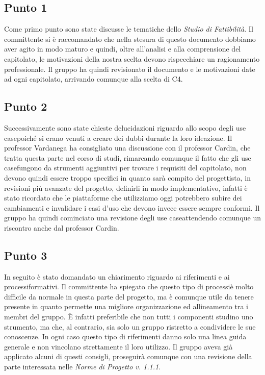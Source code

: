    \subsection{Punto 1}
        Come primo punto sono state discusse le tematiche dello \textit{Studio di Fattibilità}. Il committente si è raccomandato che nella stesura di questo documento dobbiamo aver agito in modo maturo e quindi, oltre all'analisi e alla comprensione del capitolato\glo, le motivazioni della nostra scelta devono rispecchiare un ragionamento professionale. Il gruppo ha quindi revisionato il documento e le motivazioni date ad ogni capitolato\glo, arrivando comunque alla scelta di C4.
    \subsection{Punto 2}
        Successivamente sono state chieste delucidazioni riguardo allo scopo degli use case\glosp poiché si erano venuti a creare dei dubbi durante la loro ideazione. Il professor Vardanega ha consigliato una discussione con il professor Cardin, che tratta questa parte nel corso di studi, rimarcando comunque il fatto che gli use case\glosp fungono da strumenti aggiuntivi per trovare i requisiti del capitolato\glo, non devono quindi essere troppo specifici in quanto sarà compito del progettista, in revisioni più avanzate del progetto\glo, definirli in modo implementativo, infatti è stato ricordato che le piattaforme che utilizziamo oggi potrebbero subire dei cambiamenti e invalidare i casi d'uso che devono invece essere sempre conformi. Il gruppo ha quindi cominciato una revisione degli use case\glosp attendendo comunque un riscontro anche dal professor Cardin.
    \subsection{Punto 3}
        In seguito è stato domandato un chiarimento riguardo ai riferimenti e ai processi\glosp formativi. Il committente ha spiegato che questo tipo di processi\glosp è molto difficile da normale in questa parte del progetto\glo, ma è comunque utile da tenere presente in quanto permette una migliore organizzazione ed allineamento tra i membri del gruppo. È infatti preferibile che non tutti i componenti studino uno strumento, ma che, al contrario, sia solo un gruppo ristretto a condividere le sue conoscenze. In ogni caso questo tipo di riferimenti danno solo una linea guida generale e non vincolano strettamente il loro utilizzo. Il gruppo aveva già applicato alcuni di questi consigli, proseguirà comunque con una revisione della parte interessata nelle \textit{Norme di Progetto v. 1.1.1}.
